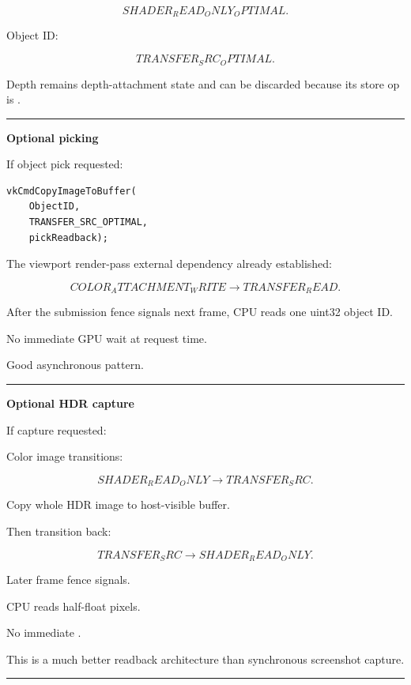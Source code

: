 \[
SHADER_READ_ONLY_OPTIMAL.
\]

Object ID:

\[
TRANSFER_SRC_OPTIMAL.
\]

Depth remains depth-attachment state and can be discarded because its store op is .

\begin{center}\rule{0.5\linewidth}{0.5pt}\end{center}

\textbf{Optional picking}

If object pick requested:

\begin{verbatim}
vkCmdCopyImageToBuffer(
    ObjectID,
    TRANSFER_SRC_OPTIMAL,
    pickReadback);
\end{verbatim}

The viewport render-pass external dependency already established:

\[
COLOR_ATTACHMENT_WRITE
\rightarrow
TRANSFER_READ.
\]

After the submission fence signals next frame, CPU reads one uint32 object ID.

No immediate GPU wait at request time.

Good asynchronous pattern.

\begin{center}\rule{0.5\linewidth}{0.5pt}\end{center}

\textbf{Optional HDR capture}

If capture requested:

Color image transitions:

\[
SHADER_READ_ONLY
\rightarrow
TRANSFER_SRC.
\]

Copy whole HDR image to host-visible buffer.

Then transition back:

\[
TRANSFER_SRC
\rightarrow
SHADER_READ_ONLY.
\]

Later frame fence signals.

CPU reads half-float pixels.

No immediate .

This is a much better readback architecture than synchronous screenshot capture.

\begin{center}\rule{0.5\linewidth}{0.5pt}\end{center}

